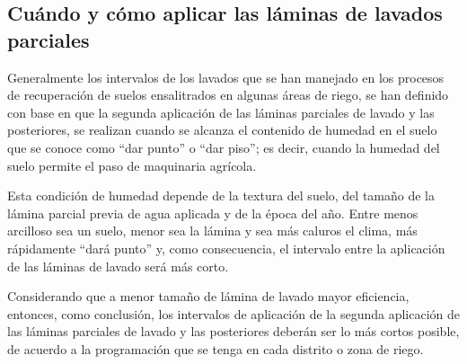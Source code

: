 \subsection{Cuándo y cómo aplicar las láminas de lavados parciales}
Generalmente los intervalos de los lavados que se han manejado en los procesos de recuperación de suelos ensalitrados en algunas áreas de riego, se han definido con base en que la segunda aplicación de las láminas parciales de lavado y las posteriores, se realizan cuando se alcanza el contenido de humedad en el suelo que se conoce como “dar punto” o “dar piso”; es decir, cuando la humedad del suelo permite el paso de maquinaria agrícola.

Esta condición de humedad depende de la textura del suelo, del tamaño de la lámina parcial previa de agua aplicada y de la época del año. Entre menos arcilloso sea un suelo, menor sea la lámina y sea más caluros el clima, más rápidamente “dará punto” y, como consecuencia, el intervalo entre la aplicación de las láminas de lavado será más corto.

Considerando que a menor tamaño de lámina de lavado mayor eficiencia, entonces, como conclusión, los intervalos de aplicación de la segunda aplicación de las láminas parciales de lavado y las posteriores deberán ser lo más cortos posible, de acuerdo a la programación que se tenga en cada distrito o zona de riego.

